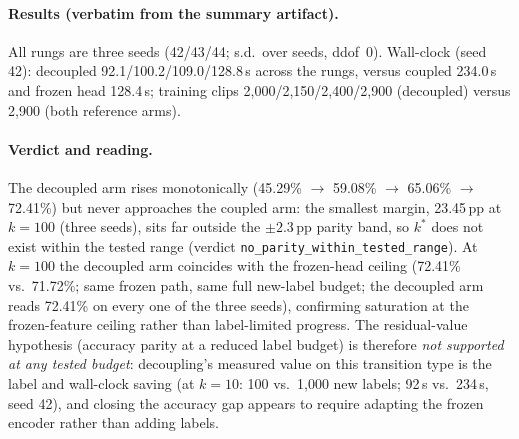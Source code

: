 \documentclass[11pt,a4paper]{article}
\begin{document}
\paragraph{Results (verbatim from the summary artifact).}
\begin{center}
\footnotesize
{}%
\end{center}
All rungs are three seeds (42/43/44; s.d.\ over seeds, ddof~0). Wall-clock (seed 42): decoupled 92.1/100.2/109.0/128.8\,s across the rungs, versus coupled 234.0\,s and frozen head 128.4\,s; training clips 2{,}000/2{,}150/2{,}400/2{,}900 (decoupled) versus 2{,}900 (both reference arms).

\paragraph{Verdict and reading.}
The decoupled arm rises monotonically (45.29\% $\to$ 59.08\% $\to$ 65.06\% $\to$ 72.41\%) but never approaches the coupled arm: the smallest margin, 23.45\,pp at $k{=}100$ (three seeds), sits far outside the $\pm2.3$\,pp parity band, so $k^{\ast}$ does not exist within the tested range (verdict \texttt{no\_parity\_within\_tested\_range}). At $k{=}100$ the decoupled arm coincides with the frozen-head ceiling (72.41\% vs.\ 71.72\%; same frozen path, same full new-label budget; the decoupled arm reads 72.41\% on every one of the three seeds), confirming saturation at the frozen-feature ceiling rather than label-limited progress. The residual-value hypothesis (accuracy parity at a reduced label budget) is therefore \emph{not supported at any tested budget}: decoupling's measured value on this transition type is the label and wall-clock saving (at $k{=}10$: 100 vs.\ 1{,}000 new labels; 92\,s vs.\ 234\,s, seed 42), and closing the accuracy gap appears to require adapting the frozen encoder rather than adding labels.
\end{document}
